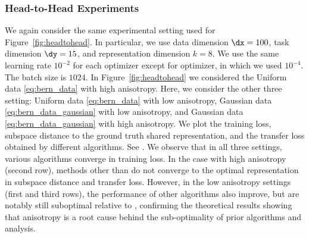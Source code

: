 \subsubsection{Head-to-Head Experiments}
We again consider the same experimental setting used for Figure~\ref{fig:headtohead}. In particular, we use data dimension \(\dx = 100\), task dimension \(\dy = 15\), and representation dimension \(k = 8\). We use the same learning rate $10^{-2}$ for each optimizer except for \NGD optimizer, in which we used $10^{-4}$. The batch size is \(1024\). In Figure~\ref{fig:headtohead} we considered the Uniform data \eqref{eq:bern_data} with high anisotropy. Here, we consider the other three setting: Uniform data \eqref{eq:bern_data} with low anisotropy, Gaussian data \eqref{eq:bern_data_gaussian} with low anisotropy, and Gaussian data \eqref{eq:bern_data_gaussian} with high anisotropy.  We plot the training loss, subspace distance to the ground truth shared representation, and the transfer loss obtained by different algorithms. See . We observe that in all three settings, various algorithms converge in training loss. In the case with high anisotropy (second row), methods other than \KFAC do not converge to the optimal representation in subspace distance and transfer loss. However, in the low anisotropy settings (first and third rows), the performance of other algorithms also improve, but are notably still suboptimal relative to \KFAC, confirming the theoretical results showing that anisotropy is a root cause behind the sub-optimality of prior algorithms and analysis.
